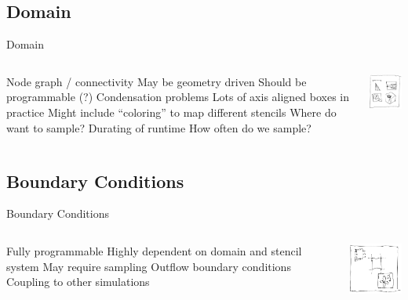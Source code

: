 \documentclass{beamer}
\begin{document}
\subsection{Domain}
\begin{frame}{Domain}
\begin{columns}
\centering
\begin{outline}
  \1 Node graph / connectivity
  \1 May be geometry driven
  \1 Should be programmable (?)
    \2 Condensation problems 
  \1 Lots of axis aligned boxes in practice
  \1 Might include ``coloring'' to map different stencils
  \1 Where do want to sample?
  \1 Durating of runtime 
    \2 How often do we sample?
\end{outline}
\centering
\includegraphics[width=4cm]{domain_drawn.png}
\end{columns}
\end{frame}

\subsection{Boundary Conditions}
\begin{frame}{Boundary Conditions}
\begin{columns}
\centering
\begin{outline}
  \1 Fully programmable
    \2 Highly dependent on domain and stencil system
  \1 May require sampling
    \2 Outflow boundary conditions
    \2 Coupling to other simulations
\end{outline}
\centering
\includegraphics[width=4cm]{bc_drawn.png}
\end{columns}
\end{frame}
\end{document}
